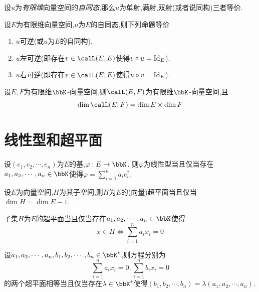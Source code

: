 \begin{cor}
    设$u$为\textit{有限维}向量空间的\textit{自同态},那么$u$为单射,满射,双射(或者说同构)三者等价.
\end{cor}

\begin{cor}
    设$E$为有限维向量空间,$u$为$E$的自同态,则下列命题等价
    
    \begin{enumerate}
        \item $u$可逆(或$u$为$E$的自同构).
        \item $u$左可逆(即存在$v \in \calL(E, E)$使得$v \circ u = \operatorname{Id}_E$).
        \item $u$右可逆(即存在$v \in \calL(E, E)$使得$u \circ v = \operatorname{Id}_E$).
    \end{enumerate}
\end{cor}

\begin{thm}
    设$E, F$为有限维$\bbK$-向量空间,则$\calL(E, F)$为有限维$\bbK$-向量空间,且
    \[ \dim \calL(E, F) = \dim E \times \dim F \]
\end{thm}

\section{线性型和超平面}

\begin{prop}
    设$(e_1, e_2, \cdots, e_n)$为$E$的基,$\varphi: E \to \bbK$.
    则$\varphi$为线性型当且仅当存在$a_1, a_2, \cdots, a_n \in \bbK$使得$\varphi = \sum\limits_{i = 1}^n a_i e_i^*$.
\end{prop}

\begin{prop}
    设$E$为向量空间,$H$为其子空间,则$H$为$E$的(向量)超平面当且仅当$\dim H = \dim E - 1$.
\end{prop}

\begin{cor}
    子集$H$为$E$的超平面当且仅当存在$a_1, a_2, \cdots, a_n \in \bbK$使得\[ x \in H \iff \sum\limits_{i = 1}^n a_i x_i = 0 \]
\end{cor}

\begin{cor}
    设$a_1, a_2, \cdots, a_n, b_1, b_2, \cdots, b_n \in \bbK^*$,则方程分别为
    \[ \sum\limits_{i = 1}^n a_i x_i = 0, \sum\limits_{i = 1}^n b_i x_i = 0 \]
    的两个超平面相等当且仅当存在$\lambda \in \bbK^*$使得$(b_1, b_2, \cdots, b_n) = \lambda (a_1, a_2, \cdots, a_n)$.
\end{cor}

